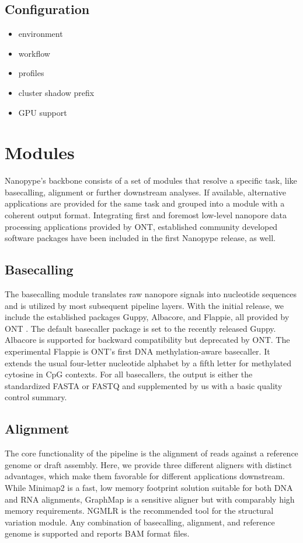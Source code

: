 \subsection{Configuration}

\begin{itemize}
	\item environment
	\item workflow
	\item profiles
	\item cluster
	\subitem shadow prefix
	\item GPU support
\end{itemize}




\section{Modules}
\label{sec:nanopype:modules}
Nanopype’s backbone consists of a set of modules that resolve a specific task, like basecalling, alignment or further downstream analyses. If available, alternative applications are provided for the same task and grouped into a module with a coherent output format. Integrating first and foremost low-level nanopore data processing applications provided by ONT, established community developed software packages have been included in the first Nanopype release, as well.

\subsection{Basecalling}
\label{subsec:nanopype:basecalling}
The basecalling module translates raw nanopore signals into nucleotide sequences and is utilized by most subsequent pipeline layers. With the initial release, we include the established packages Guppy, Albacore, and Flappie, all provided by ONT \cite{Wick2019}. The default basecaller package is set to the recently released Guppy. Albacore is supported for backward compatibility but deprecated by ONT. The experimental Flappie is ONT’s first DNA methylation-aware basecaller. It extends the usual four-letter nucleotide alphabet by a fifth letter for methylated cytosine in CpG contexts. For all basecallers, the output is either the standardized FASTA or FASTQ and supplemented by us with a basic quality control summary.

\subsection{Alignment}
\label{subsec:nanopype:alignment}
The core functionality of the pipeline is the alignment of reads against a reference genome or draft assembly. Here, we provide three different aligners with distinct advantages, which make them favorable for different applications downstream. While Minimap2 \cite{Li2018} is a fast, low memory footprint solution suitable for both DNA and RNA alignments, GraphMap \cite{Sovic2016} is a sensitive aligner but with comparably high memory requirements. NGMLR \cite{Sedlazeck2018} is the recommended tool for the structural variation module. Any combination of basecalling, alignment, and reference genome is supported and reports BAM format files.

